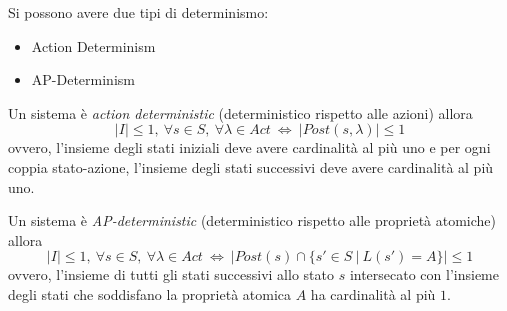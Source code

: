 Si possono avere due tipi di determinismo:

\begin{itemize}
 \item Action Determinism
 \item AP-Determinism
\end{itemize}

Un sistema è \emph{action deterministic} (deterministico rispetto alle azioni) allora
\begin{equation}
|I| \leq 1,\ \forall s \in S,\ \forall \lambda \in Act\ \Leftrightarrow\ \rvert Post( s, \lambda ) \rvert \leq 1
\end{equation}
ovvero, l'insieme degli stati iniziali deve avere cardinalità al più uno e per ogni coppia stato-azione, l'insieme degli stati successivi deve avere cardinalità al più uno.

Un sistema è \emph{AP-deterministic} (deterministico rispetto alle proprietà atomiche) allora
\begin{equation}
 |I| \leq 1,\ \forall s \in S,\ \forall \lambda \in Act\ \Leftrightarrow\ \rvert Post(s) \cap \{ s' \in S\ |\ L(s') = A \} \rvert \leq 1
\end{equation}
ovvero, l'insieme di tutti gli stati successivi allo stato $s$ intersecato con l'insieme degli stati che soddisfano la proprietà atomica $A$ ha cardinalità al più $1$.



 


 

